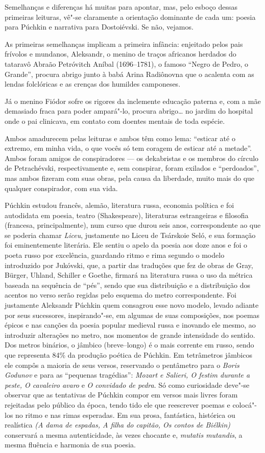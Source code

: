 Semelhanças e diferenças há muitas para apontar, mas, pelo esboço dessas
primeiras leituras, vê"-se claramente a orientação dominante de cada um:
poesia para Púchkin e narrativa para Dostoiévski. Se não, vejamos.

As primeiras semelhanças implicam a primeira infância: enjeitado pelos
pais frívolos e mundanos, Aleksandr, o menino de traços africanos
herdados do tataravô Abraão Petróvitch Aníbal (1696--1781), o famoso
``Negro de Pedro, o Grande'', procura abrigo junto à babá Arina
Radiônovna que o acalenta com as lendas folclóricas e as crenças dos
humildes camponeses.

Já o menino Fiódor sofre os rigores da inclemente educação paterna e, com a
mãe demasiado fraca para poder ampará"-lo, procura abrigo\ldots{} no jardim do
hospital onde o pai clinicava, em contato com doentes mentais de toda espécie.

Ambos amadurecem pelas leituras e ambos têm como lema: ``esticar até o
extremo, em minha vida, o que vocês só tem coragem de esticar até a
metade''. Ambos foram amigos de conspiradores --- os dekabristas e os
membros do círculo de Petrachévski, respectivamente e, sem conspirar,
foram exilados e ``perdoados'', mas ambos fizeram com suas obras, pela
causa da liberdade, muito mais do que qualquer conspirador, com sua
vida.

Púchkin estudou francês, alemão, literatura russa, economia política e
foi autodidata em poesia, teatro (Shakespeare), literaturas
estrangeiras e filosofia (francesa, principalmente), num curso que
durou seis anos, correspondente ao que se poderia chamar \emph{Liceu},
justamente no Liceu de Tsárskoie Seló, e sua formação foi eminentemente
literária. Ele sentiu o apelo da poesia aos doze anos e foi o poeta
russo por excelência, guardando ritmo e rima segundo o modelo
introduzido por Jukóvski, que, a partir das traduções que fez de obras
de Gray, Bürger, Uhland, Schiller e Goethe, firmará na literatura russa
o uso da métrica baseada na sequência de ``pés'', sendo que sua
distribuição e a distribuição dos acentos no verso serão regidas pelo
esquema do metro correspondente. Foi justamente Aleksandr Púchkin quem
consagrou esse novo modelo, levado adiante por seus sucessores, inspirando"-se, em algumas de suas
composições, nos poemas épicos e nas canções da poesia popular medieval
russa e inovando ele mesmo, ao introduzir alterações no metro, nos
momentos de grande intensidade do sentido. Dos metros binários, o
jâmbico (breve--longo) é o mais corrente em russo, sendo que representa 84\% da
produção poética de Púchkin. Em tetrâmetros jâmbicos ele compôs a
maioria de seus versos, reservando o pentâmetro para o \emph{Boris
Godunov} e para as ``pequenas tragédias'': \emph{Mozart e Salieri,
O festim durante a peste, O cavaleiro avaro} e \emph{O convidado de
pedra}. Só como curiosidade deve"-se observar que as tentativas de
Púchkin compor em versos mais livres foram rejeitadas pelo público da
época, tendo tido ele que reescrever poemas e colocá"-los no ritmo e nas rimas
esperadas. Em sua prosa, fantástica, histórica ou realística \emph{(A
dama de espadas, A filha do capitão, Os contos de Biélkin)} conservará a
mesma autenticidade, às vezes chocante e, \emph{mutatis mutandis}, a
mesma fluência e harmonia de sua poesia.


